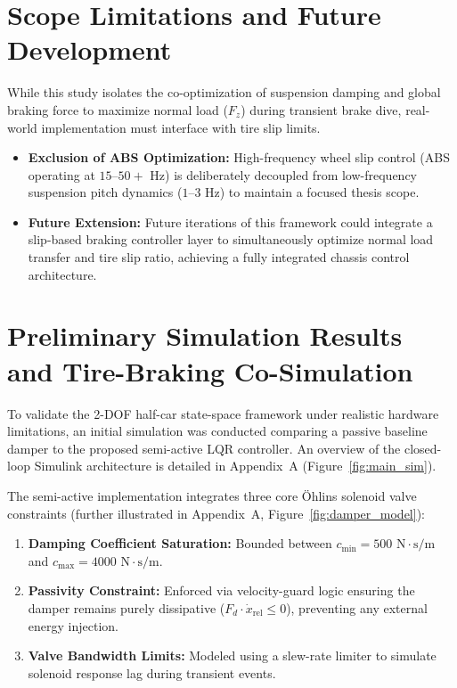\documentclass[11pt,a4paper]{article}
\begin{document}
\section{Scope Limitations and Future Development}
While this study isolates the co-optimization of suspension damping and global braking force to maximize normal load ($F_z$) during transient brake dive, real-world implementation must interface with tire slip limits. 

\begin{itemize}
    \item \textbf{Exclusion of ABS Optimization:} High-frequency wheel slip control (ABS operating at $15\text{--}50+\text{ Hz}$) is deliberately decoupled from low-frequency suspension pitch dynamics ($1\text{--}3\text{ Hz}$) to maintain a focused thesis scope.
    \item \textbf{Future Extension:} Future iterations of this framework could integrate a slip-based braking controller layer to simultaneously optimize normal load transfer and tire slip ratio, achieving a fully integrated chassis control architecture.
\end{itemize}

\section{Preliminary Simulation Results and Tire-Braking Co-Simulation}
To validate the 2-DOF half-car state-space framework under realistic hardware limitations, an initial simulation was conducted comparing a passive baseline damper to the proposed semi-active LQR controller. An overview of the closed-loop Simulink architecture is detailed in Appendix~A (Figure~\ref{fig:main_sim}).

The semi-active implementation integrates three core Öhlins solenoid valve constraints (further illustrated in Appendix~A, Figure~\ref{fig:damper_model}):
\begin{enumerate}
    \item \textbf{Damping Coefficient Saturation:} Bounded between $c_{\min} = 500\text{ N}\cdot\text{s/m}$ and $c_{\max} = 4000\text{ N}\cdot\text{s/m}$.
    \item \textbf{Passivity Constraint:} Enforced via velocity-guard logic ensuring the damper remains purely dissipative ($F_d \cdot \dot{x}_{\text{rel}} \le 0$), preventing any external energy injection.
    \item \textbf{Valve Bandwidth Limits:} Modeled using a slew-rate limiter to simulate solenoid response lag during transient events.
\end{enumerate}
\end{document}
